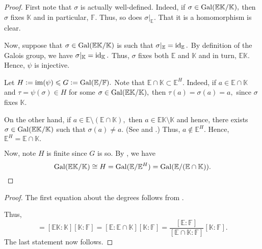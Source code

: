 \secondiso*\label{prop:secondiso2}
\begin{flushright}\hyperref[prop:secondiso]{\upsym}\end{flushright}
\begin{proof}
    First note that $\sigma$ is actually well-defined. Indeed, if $\sigma \in \operatorname{Gal}(\mathbb{E}\mathbb{K}/\mathbb{K}),$ then $\sigma$ fixes $\mathbb{K}$ and in particular, $\mathbb{F}.$ Thus, so does $\sigma|_{\mathbb{E}}.$ That it is a homomorphism is clear.

    Now, suppose that $\sigma \in \operatorname{Gal}(\mathbb{E}\mathbb{K}/\mathbb{K})$ is such that $\sigma|_{\mathbb{E}} = \operatorname{id}_{\mathbb{E}}.$ By definition of the Galois group, we have $\sigma|_{\mathbb{K}} = \operatorname{id}_{\mathbb{K}}.$ Thus, $\sigma$ fixes both $\mathbb{E}$ and $\mathbb{K}$ and in turn, $\mathbb{E}\mathbb{K}.$ Hence, $\psi$ is injective.

    Let $H \vcentcolon= \operatorname{im}(\psi) \leqslant G \vcentcolon= \operatorname{Gal}(\mathbb{E}/\mathbb{F}).$ Note that $\mathbb{E} \cap \mathbb{K} \subset \mathbb{E}^H.$ Indeed, if $a \in \mathbb{E} \cap \mathbb{K}$ and $\tau = \psi(\sigma) \in H$ for some $\sigma \in \operatorname{Gal}(\mathbb{E}\mathbb{K}/\mathbb{K}),$ then $\tau(a) = \sigma(a) = a,$ since $\sigma$ fixes $\mathbb{K}.$

    On the other hand, if $a \in \mathbb{E} \setminus (\mathbb{E} \cap \mathbb{K}),$ then $a \in \mathbb{E}\mathbb{K} \setminus \mathbb{K}$ and hence, there exists $\sigma \in \operatorname{Gal}(\mathbb{E}\mathbb{K}/\mathbb{K})$ such that $\sigma(a) \neq a.$ (See  and .) Thus, $a \notin \mathbb{E}^H.$ Hence, $\mathbb{E}^H = \mathbb{E} \cap \mathbb{K}.$ 

    Now, note $H$ is finite since $G$ is so. By , we have 
    \begin{equation*} 
        \operatorname{Gal}(\mathbb{E}\mathbb{K}/\mathbb{K}) \cong H = \operatorname{Gal}(\mathbb{E}/\mathbb{E}^H) = \operatorname{Gal}(\mathbb{E}/(\mathbb{E} \cap \mathbb{K})). \qedhere
    \end{equation*}
\end{proof}

\secondisoindex*\label{cor:secondisoindex2}
\begin{flushright}\hyperref[cor:secondisoindex]{\upsym}\end{flushright}
\begin{proof}
    The first equation about the degrees follows from .

    Thus,
    \begin{equation*} 
        [\mathbb{E}\mathbb{K} : \mathbb{F}] = [\mathbb{E}\mathbb{K} : \mathbb{K}][\mathbb{K} : \mathbb{F}] = [\mathbb{E} : \mathbb{E} \cap \mathbb{K}][\mathbb{K} : \mathbb{F}] = \frac{[\mathbb{E} : \mathbb{F}]}{[\mathbb{E} \cap \mathbb{K} : \mathbb{F}]}[\mathbb{K} : \mathbb{F}].
    \end{equation*}
    The last statement now follows.
\end{proof}

